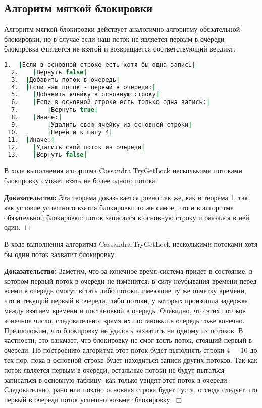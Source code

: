 \subsection{Алгоритм мягкой блокировки}

Алгоритм мягкой блокировки действует аналогично алгоритму обязательной блокировки, но в случае если наш поток не является первым в очереди блокировка считается не взятой и возвращается соответствующий вердикт.

\begin{lstlisting}[language=csh,caption={Алгоритм Cassandra.TryGetLock(lockId, threadId)}]
  1.  |Если в основной строке есть хотя бы одна запись|
  2.  	|Вернуть false|
  3.  |Добавить поток в очередь|
  4.  |Если наш поток - первый в очереди:|
  5.  	|Добавить ячейку в основную строку|
  6.  	|Если в основной строке есть только одна запись:|
  7.  		|Вернуть true|
  8.  	|Иначе:|
  9.  		|Удалить свою ячейку из основной строки|
 10.  		|Перейти к шагу 4|
 11.  |Иначе:|
 12.  	|Удалить свой поток из очереди|
 13.  	|Вернуть false|
\end{lstlisting}

\begin{theorem}
В ходе выполнения алгоритма Cassandra.TryGetLock несколькими потоками блокировку сможет взять не более одного потока.
\end{theorem}
\textbf{Доказательство:}
Эта теорема доказывается ровно так же, как и теорема 1, так как условие успешного взятия блокировки то же самое, что и в алгоритме обязательной блокировки: поток записался в основную строку и оказался в ней один.
$\Box$

\begin{theorem}
В ходе выполнения алгоритма Cassandra.TryGetLock несколькими потоками хотя бы один поток захватит блокировку.
\end{theorem}
\textbf{Доказательство:}
Заметим, что за конечное время система придет в состояние, в котором первый поток в очереди не изменится: в силу неубывания времени перед всеми в очередь смогут встать либо потоки, имеющие ту же отметку времени, что и текущий первый в очереди, либо потоки, у которых произошла задержка между взятием времени и постановкой в очередь. Очевидно, что этих потоков конечное число, следовательно, время их постановки в очередь тоже конечно.
Предположим, что блокировку не удалось захватить ни одному из потоков. В частности, это означает, что блокировку не смог взять поток, стоящий первый в очереди. По построению алгоритма этот поток будет выполнять строки 4~---10 до тех пор, пока в основной строке будет находиться записи других потоков. Так как поток является первым в очереди, остальные потоки не будут пытаться записаться в основную таблицу, как только увидят этот поток в очереди. Следовательно, рано или поздно основная строка будет пуста, отсюда следует что первый в очереди поток успешно возьмет блокировку.
$\Box$
